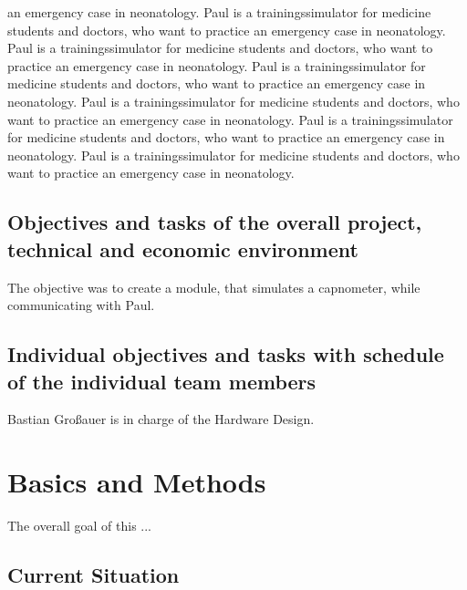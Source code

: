 \documentclass[12pt]{article}
\begin{document}
an emergency case in neonatology. Paul is a trainingssimulator for medicine students and doctors, who want to practice
an emergency case in neonatology. Paul is a trainingssimulator for medicine students and doctors, who want to practice
an emergency case in neonatology. Paul is a trainingssimulator for medicine students and doctors, who want to practice
an emergency case in neonatology. Paul is a trainingssimulator for medicine students and doctors, who want to practice
an emergency case in neonatology. Paul is a trainingssimulator for medicine students and doctors, who want to practice
an emergency case in neonatology. Paul is a trainingssimulator for medicine students and doctors, who want to practice
an emergency case in neonatology. 


\subsection{Objectives and tasks of the overall project, technical and economic environment}

The objective was to create a module, that simulates a capnometer, while communicating
with Paul.


\subsection{Individual objectives and tasks with schedule of the individual team members}

Bastian Großauer is in charge of the Hardware Design.

\pagebreak




\section{Basics and Methods}                                                               %

The overall goal of this ...


\subsection{Current Situation}
\end{document}
